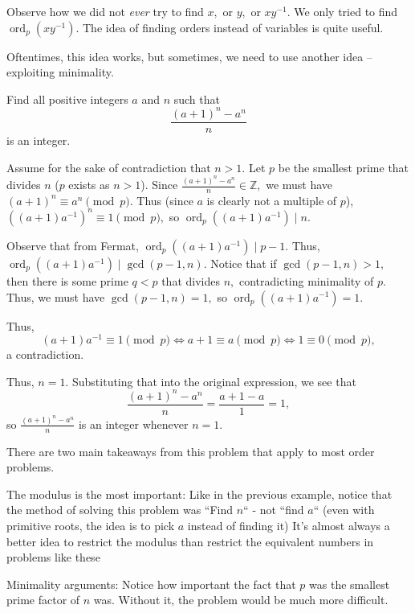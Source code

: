 \documentclass{article}
\begin{document}
Observe how we did not \emph{ever} try to find $x,$ or $y,$ or $xy^{-1}.$ We only tried to find $\operatorname{ord}_p(xy^{-1}).$ The idea of finding orders instead of variables is quite useful.

Oftentimes, this idea works, but sometimes, we need to use another idea -- exploiting minimality.

\begin{exam}
Find all positive integers $a$ and $n$ such that $$\frac{(a+1)^n - a^n}{n}$$ is an integer.
\end{exam}

\begin{sol}
Assume for the sake of contradiction that $n>1.$ Let $p$ be the smallest prime that divides $n$ ($p$ exists as $n>1$). Since $\frac{(a+1)^n - a^n}{n} \in \mathbb{Z},$ we must have $(a+1)^{n} \equiv a^{n} \pmod{p}.$ Thus (since $a$ is clearly not a multiple of $p$), $((a+1)a^{-1})^{n} \equiv 1 \pmod{p},$ so $\operatorname{ord}_p((a+1)a^{-1}) \mid n.$

Observe that from Fermat, $\operatorname{ord}_p((a+1)a^{-1}) \mid p-1.$ Thus, $\operatorname{ord}_p((a+1)a^{-1}) \mid \gcd(p-1, n).$ Notice that if $\gcd(p-1, n) > 1,$ then there is some prime $q < p$ that divides $n,$ contradicting minimality of $p.$ Thus, we must have $\gcd(p-1, n) = 1,$ so $\operatorname{ord}_p((a+1)a^{-1}) = 1.$

Thus, $$(a+1)a^{-1} \equiv 1 \pmod{p} \Longleftrightarrow a+1 \equiv a \pmod{p} \Longleftrightarrow 1 \equiv 0 \pmod{p},$$ a contradiction. 

Thus, $n = 1.$ Substituting that into the original expression, we see that $$\frac{(a+1)^n-a^n}{n} = \frac{a+1-a}{1} = 1,$$ so $\frac{(a+1)^n-a^n}{n}$ is an integer whenever $n = 1.$
\end{sol}

There are two main takeaways from this problem that apply to most order problems.

\begin{itemize}
\Item The modulus is the most important: Like in the previous example, notice that the method of solving this problem was ``Find $n$`` - not ``find $a$`` (even with primitive roots, the idea is to pick $a$ instead of finding it) It's almost always a better idea to restrict the modulus than restrict the equivalent numbers in problems like these

\Item Minimality arguments: Notice how important the fact that $p$ was the smallest prime factor of $n$ was. Without it, the problem would be much more difficult.
\end{itemize}
\end{document}
